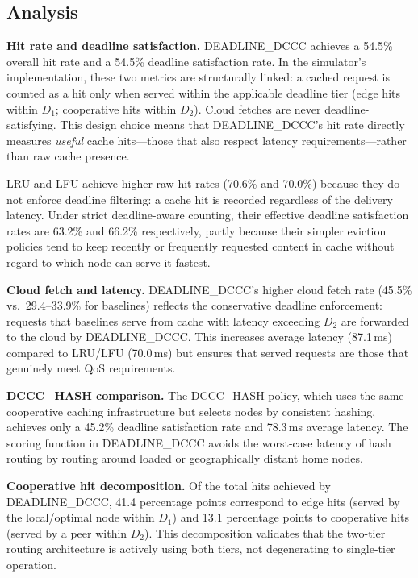\documentclass[conference]{IEEEtran}
\begin{document}
\subsection{Analysis}

\textbf{Hit rate and deadline satisfaction.}
DEADLINE\_DCCC achieves a 54.5\% overall hit rate and a 54.5\%
deadline satisfaction rate.  In the simulator's implementation, these
two metrics are structurally linked: a cached request is counted as a
hit only when served within the applicable deadline tier (edge hits
within $D_1$; cooperative hits within $D_2$).  Cloud fetches are never
deadline-satisfying.  This design choice means that DEADLINE\_DCCC's
hit rate directly measures \emph{useful} cache hits—those that also
respect latency requirements—rather than raw cache presence.

LRU and LFU achieve higher raw hit rates (70.6\% and 70.0\%) because
they do not enforce deadline filtering: a cache hit is recorded
regardless of the delivery latency.  Under strict deadline-aware
counting, their effective deadline satisfaction rates are 63.2\% and
66.2\% respectively, partly because their simpler eviction policies
tend to keep recently or frequently requested content in cache without
regard to which node can serve it fastest.

\textbf{Cloud fetch and latency.}
DEADLINE\_DCCC's higher cloud fetch rate (45.5\% vs.\ 29.4--33.9\%
for baselines) reflects the conservative deadline enforcement: requests
that baselines serve from cache with latency exceeding $D_2$ are
forwarded to the cloud by DEADLINE\_DCCC.  This increases average
latency (87.1\,ms) compared to LRU/LFU (70.0\,ms) but ensures that
served requests are those that genuinely meet QoS requirements.

\textbf{DCCC\_HASH comparison.}
The DCCC\_HASH policy, which uses the same cooperative caching
infrastructure but selects nodes by consistent hashing, achieves only
a 45.2\% deadline satisfaction rate and 78.3\,ms average latency.
The scoring function in DEADLINE\_DCCC avoids the worst-case latency
of hash routing by routing around loaded or geographically distant
home nodes.

\textbf{Cooperative hit decomposition.}
Of the total hits achieved by DEADLINE\_DCCC, 41.4 percentage points
correspond to edge hits (served by the local/optimal node within
$D_1$) and 13.1 percentage points to cooperative hits (served by a
peer within $D_2$).  This decomposition validates that the two-tier
routing architecture is actively using both tiers, not degenerating to
single-tier operation.
\end{document}
